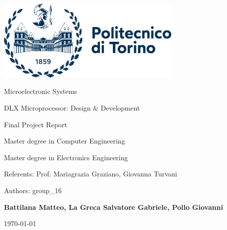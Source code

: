 \documentclass[10pt,  english, makeidx, a4paper, titlepage, oneside]{book}
\begin{document}
\frontmatter
\begin{titlepage}
\vspace{0cm}
\centerline{
\includegraphics[width=9cm]{./logopoli}} 
\vspace{0.5cm}
\vspace{2.5cm}
\centerline{\huge\sf Microelectronic Systems}
\vspace{1cm}
\centerline{\Huge\sf DLX Microprocessor: Design \& Development}
\bigskip
\centerline{\huge\sf Final Project Report}
\vspace{1cm}
\centerline{\Large Master degree in Computer Engineering}
\bigskip
\centerline{\Large Master degree in Electronics Engineering}
\vspace{4.5cm}
%
\centerline{\large Referents: Prof. Mariagrazia Graziano, Giovanna Turvani}
\bigskip
\vspace{1cm}
\centerline{\large Authors: group\_16}
\bigskip
\centerline{\large \textbf{Battilana Matteo, La Greca Salvatore Gabriele, Pollo Giovanni}}
%
\vspace{2cm}
\centerline{\large \today}
\end{titlepage}


\shipout\null



\tableofcontents
\lstlistoflistings

\mainmatter












\appendix
% 
%
\end{document}
